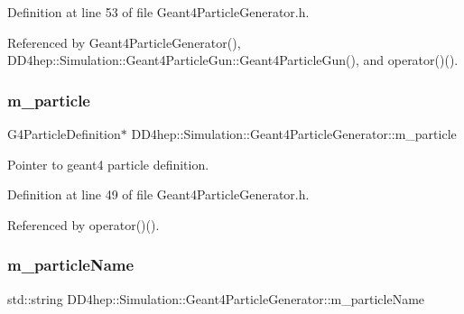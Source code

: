 Definition at line 53 of file Geant4\+Particle\+Generator.\+h.



Referenced by Geant4\+Particle\+Generator(), D\+D4hep\+::\+Simulation\+::\+Geant4\+Particle\+Gun\+::\+Geant4\+Particle\+Gun(), and operator()().

\hypertarget{class_d_d4hep_1_1_simulation_1_1_geant4_particle_generator_a9f974a1df5025bb1ff4f65d6ed73bbd1}{}\label{class_d_d4hep_1_1_simulation_1_1_geant4_particle_generator_a9f974a1df5025bb1ff4f65d6ed73bbd1} 
\subsubsection{\texorpdfstring{m\+\_\+particle}{m\_particle}}
{\footnotesize\ttfamily G4\+Particle\+Definition$\ast$ D\+D4hep\+::\+Simulation\+::\+Geant4\+Particle\+Generator\+::m\+\_\+particle\hspace{0.3cm}{\ttfamily [protected]}}



Pointer to geant4 particle definition. 



Definition at line 49 of file Geant4\+Particle\+Generator.\+h.



Referenced by operator()().

\hypertarget{class_d_d4hep_1_1_simulation_1_1_geant4_particle_generator_ae7181a20c8374bee76cd7d29ea0e7dc7}{}\label{class_d_d4hep_1_1_simulation_1_1_geant4_particle_generator_ae7181a20c8374bee76cd7d29ea0e7dc7} 
\subsubsection{\texorpdfstring{m\+\_\+particle\+Name}{m\_particleName}}
{\footnotesize\ttfamily std\+::string D\+D4hep\+::\+Simulation\+::\+Geant4\+Particle\+Generator\+::m\+\_\+particle\+Name\hspace{0.3cm}{\ttfamily [protected]}}



